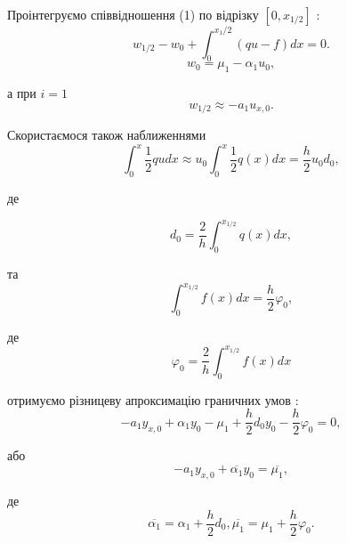 Проінтегруємо співвідношення (1) по відрізку $\left[0, x_{1 / 2}\right]$ :
$$
w_{1 / 2}-w_0+\int_0^{x_1 / 2}(q u-f) d x=0 .
$$
$$
w_0=\mu_1-\alpha_1 u_0,
$$

а при $i=1$
$$
w_{1 / 2} \approx-a_1 u_{x, 0} .
$$

Скористаємося також наближеннями
$$
\int_0^x \frac{1}{2} q u d x \approx u_0 \int_0^x \frac{1}{2} q(x) d x=\frac{h}{2} u_0 d_0,
$$

де


$$
d_0=\frac{2}{h} \int_0^{x_{1 / 2}} q(x) d x,
$$

та
$$
\int_0^{x_{1 / 2}} f(x) d x=\frac{h}{2} \varphi_0,
$$

де
$$
\varphi_0=\frac{2}{h} \int_0^{x_{1 / 2}} f(x) d x
$$

отримуємо різницеву апроксимацію граничних умов :
$$
-a_1 y_{x, 0}+\alpha_1 y_0-\mu_1+\frac{h}{2} d_0 y_0-\frac{h}{2} \varphi_0=0,
$$

або
$$
-a_1 y_{x, 0}+\overline{\alpha_1} y_0=\overline{\mu_1},
$$

де
$$
\overline{\alpha_1}=\alpha_1+\frac{h}{2} d_0, \overline{\mu_1}=\mu_1+\frac{h}{2} \varphi_0 .
$$